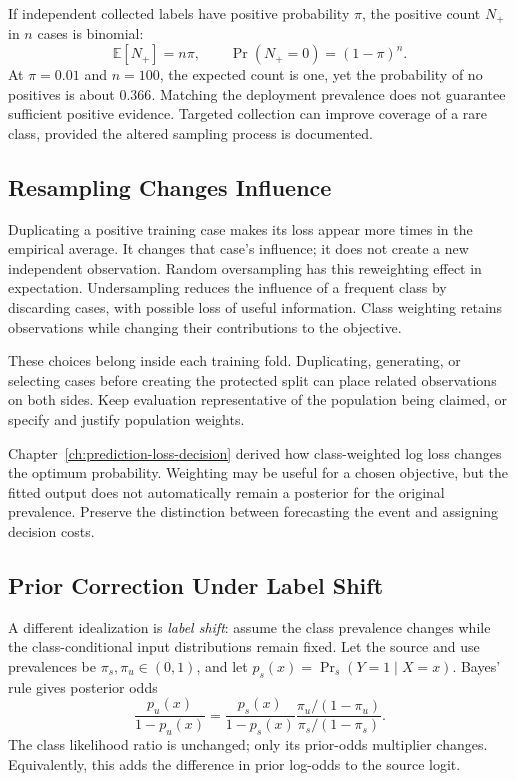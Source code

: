 If independent collected labels have positive probability $\pi$, the positive count $N_+$ in $n$ cases is binomial:
\[
\mathbb E[N_+]=n\pi,\qquad
\Pr(N_+=0)=(1-\pi)^n.
\]
At $\pi=0.01$ and $n=100$, the expected count is one, yet the probability of no positives is about $0.366$. Matching the deployment prevalence does not guarantee sufficient positive evidence. Targeted collection can improve coverage of a rare class, provided the altered sampling process is documented.

\subsection{Resampling Changes Influence}

Duplicating a positive training case makes its loss appear more times in the empirical average. It changes that case's influence; it does not create a new independent observation. Random oversampling has this reweighting effect in expectation. Undersampling reduces the influence of a frequent class by discarding cases, with possible loss of useful information. Class weighting retains observations while changing their contributions to the objective.

These choices belong inside each training fold. Duplicating, generating, or selecting cases before creating the protected split can place related observations on both sides. Keep evaluation representative of the population being claimed, or specify and justify population weights.

Chapter~\ref{ch:prediction-loss-decision} derived how class-weighted log loss changes the optimum probability. Weighting may be useful for a chosen objective, but the fitted output does not automatically remain a posterior for the original prevalence. Preserve the distinction between forecasting the event and assigning decision costs.

\subsection{Prior Correction Under Label Shift}

A different idealization is \emph{label shift}: assume the class prevalence changes while the class-conditional input distributions remain fixed. Let the source and use prevalences be $\pi_s,\pi_u\in(0,1)$, and let $p_s(x)=\Pr_s(Y=1\mid X=x)$. Bayes' rule gives posterior odds
\[
\frac{p_u(x)}{1-p_u(x)}
=\frac{p_s(x)}{1-p_s(x)}
\frac{\pi_u/(1-\pi_u)}{\pi_s/(1-\pi_s)}.
\]
The class likelihood ratio is unchanged; only its prior-odds multiplier changes. Equivalently, this adds the difference in prior log-odds to the source logit.

